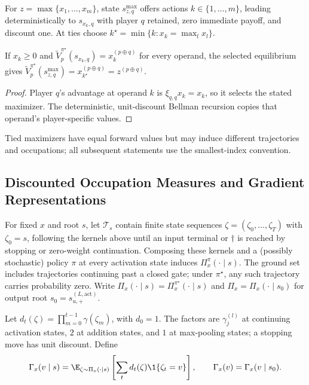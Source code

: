 \begin{definition}\label{ptnb:def:maxpool-subgame}
For $z=\max\{x_1,\dots,x_m\}$, state $s_{z,q}^{\max}$ offers actions $k\in\{1,\dots,m\}$,
leading deterministically to $s_{x_k,q}$ with player $q$ retained, zero immediate payoff, and
discount one. At ties choose $k^\star=\min\{k:x_k=\max_l x_l\}$.
\end{definition}
\begin{proposition}\label{ptnb:prop:maxpool-equivalence}
If $x_k\geq0$ and $\tilde V_p^{\pi^\star}(s_{x_k,q})=x_k^{(p\oplus q)}$ for every operand,
the selected equilibrium gives
$\tilde V_p^{\pi^\star}(s_{z,q}^{\max})=x_{k^\star}^{(p\oplus q)}=z^{(p\oplus q)}$.
\end{proposition}
\begin{proof}
Player $q$'s advantage at operand $k$ is $\xi_{q,q}x_k=x_k$, so it selects the stated maximizer.
The deterministic, unit-discount Bellman recursion copies that operand's player-specific values.
\end{proof}
Tied maximizers have equal forward values but may induce different trajectories and occupations;
all subsequent statements use the smallest-index convention.

\subsection{Discounted Occupation Measures and Gradient Representations}\label{ptnb:app:occ-deriv}\label{subsec:gradient_occupation}

\begin{definition}\label{ptnb:def:trajectory-distribution}
For fixed $x$ and root $s$, let $\mathcal T_s$ contain finite state sequences
$\zeta=(\zeta_0,\dots,\zeta_T)$ with $\zeta_0=s$, following the kernels above until an input
terminal or $\dagger$ is reached by stopping or zero-weight continuation. Composing these kernels and a
(possibly stochastic) policy $\pi$ at every activation state induces $\Pi_x^\pi(\cdot\mid s)$.
The ground set includes trajectories continuing past a closed gate; under $\pi^\star$, any such trajectory carries probability zero. Write $\Pi_x(\cdot\mid s)=\Pi_x^{\pi^\star}(\cdot\mid s)$ and
$\Pi_x=\Pi_x(\cdot\mid s_0)$ for output root $s_0=s_{u,+}^{(L,\mathrm{act})}$.
\end{definition}

\begin{definition}\label{ptnb:def:occupation}
Let $d_t(\zeta)=\prod_{m=0}^{t-1}\gamma(\zeta_m)$, with $d_0=1$.
The factors are $\gamma_j^{(l)}$ at continuing activation states, $2$ at addition states, and $1$
at max-pooling states; a stopping move has unit discount. Define
\begin{equation}\label{ptnb:eq:attribution}
    \Gamma_x(v\mid s)=\E_{\zeta\sim\Pi_x(\cdot\mid s)}
       \left[\sum_t d_t(\zeta)\1\{\zeta_t=v\}\right],
    \qquad \Gamma_x(v)=\Gamma_x(v\mid s_0).
\end{equation}
\end{definition}

